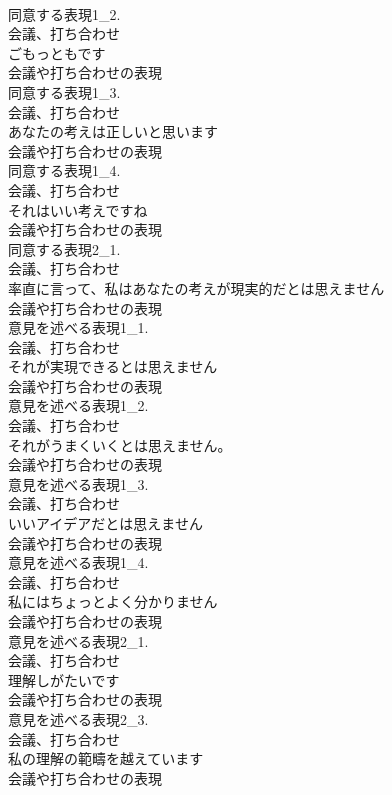 \documentclass[8pt]{extreport}
\begin{document}
\begin{CJK}{UTF8}{min}
\\	同意する表現1_2.
\\	会議、打ち合わせ
\\	ごもっともです	
\\	会議や打ち合わせの表現
\\	同意する表現1_3.
\\	会議、打ち合わせ
\\	あなたの考えは正しいと思います	
\\	会議や打ち合わせの表現
\\	同意する表現1_4.
\\	会議、打ち合わせ
\\	それはいい考えですね	
\\	会議や打ち合わせの表現
\\	同意する表現2_1.
\\	会議、打ち合わせ
\\	率直に言って、私はあなたの考えが現実的だとは思えません	
\\	会議や打ち合わせの表現
\\	意見を述べる表現1_1.
\\	会議、打ち合わせ
\\	それが実現できるとは思えません	
\\	会議や打ち合わせの表現
\\	意見を述べる表現1_2.
\\	会議、打ち合わせ
\\	それがうまくいくとは思えません。	
\\	会議や打ち合わせの表現
\\	意見を述べる表現1_3.
\\	会議、打ち合わせ
\\	いいアイデアだとは思えません	
\\	会議や打ち合わせの表現
\\	意見を述べる表現1_4.
\\	会議、打ち合わせ
\\	私にはちょっとよく分かりません	
\\	会議や打ち合わせの表現
\\	意見を述べる表現2_1.
\\	会議、打ち合わせ
\\	理解しがたいです	
\\	会議や打ち合わせの表現
\\	意見を述べる表現2_3.
\\	会議、打ち合わせ
\\	私の理解の範疇を越えています	
\\	会議や打ち合わせの表現

\end{CJK}
\end{document}
